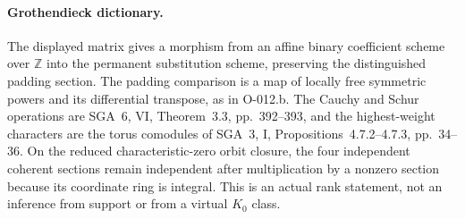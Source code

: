 \paragraph{Grothendieck dictionary.}
The displayed matrix gives a morphism from an affine binary
coefficient scheme over \(\mathbb Z\) into the permanent
substitution scheme, preserving the distinguished padding
section. The padding comparison is a map of locally free
symmetric powers and its differential transpose, as in
O-012.b. The Cauchy and Schur operations are SGA~6, VI,
Theorem~3.3, pp.~392--393, and the highest-weight characters
are the torus comodules of SGA~3, I, Propositions~4.7.2--4.7.3,
pp.~34--36. On the reduced characteristic-zero orbit closure,
the four independent coherent sections remain independent
after multiplication by a nonzero section because its
coordinate ring is integral. This is an actual rank statement,
not an inference from support or from a virtual \(K_0\) class.
